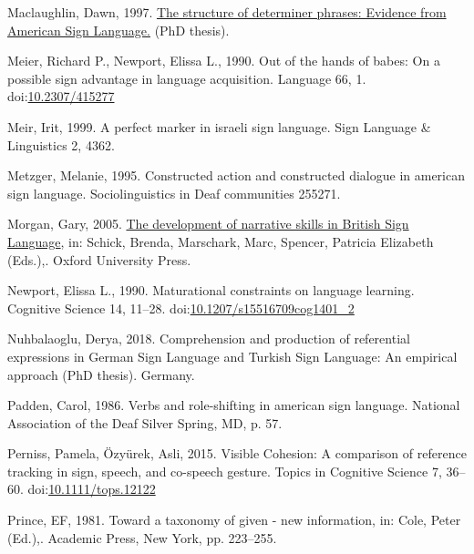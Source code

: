 \documentclass[]{elsarticle} %
\newlength{\cslhangindent}
\newenvironment{CSLReferences}[2] %
 {%
  \setlength{\parindent}{0pt}
  \ifodd #1 \everypar{\setlength{\hangindent}{\cslhangindent}}\ignorespaces\fi
  \ifnum #2 > 0
  \setlength{\parskip}{#2\baselineskip}
  \fi
 }%
 {}
\begin{document}
\begin{CSLReferences}{1}{0}
\leavevmode{}%
Maclaughlin, Dawn, 1997.
\href{http://lear.unive.it/jspui/handle/11707/7016}{The structure of
determiner phrases: Evidence from American Sign Language.} (PhD thesis).

\leavevmode{}%
Meier, Richard P., Newport, Elissa L., 1990. Out of the hands of babes:
On a possible sign advantage in language acquisition. Language 66, 1.
doi:\href{https://doi.org/10.2307/415277}{10.2307/415277}

\leavevmode{}%
Meir, Irit, 1999. A perfect marker in israeli sign language. Sign
Language \& Linguistics 2, 4362.

\leavevmode{}%
Metzger, Melanie, 1995. Constructed action and constructed dialogue in
american sign language. Sociolinguistics in Deaf communities 255271.

\leavevmode{}%
Morgan, Gary, 2005.
\href{http://www.oxfordscholarship.com/view/10.1093/acprof:oso/9780195180947.001.0001/acprof-9780195180947}{The
development of narrative skills in British Sign Language}, in: Schick,
Brenda, Marschark, Marc, Spencer, Patricia Elizabeth (Eds.),. Oxford
University Press.

\leavevmode{}%
Newport, Elissa L., 1990. Maturational constraints on language learning.
Cognitive Science 14, 11--28.
doi:\href{https://doi.org/10.1207/s15516709cog1401_2}{10.1207/s15516709cog1401\_2}

\leavevmode{}%
Nuhbalaoglu, Derya, 2018. Comprehension and production of referential
expressions in German Sign Language and Turkish Sign Language: An
empirical approach (PhD thesis). Germany.

\leavevmode{}%
Padden, Carol, 1986. Verbs and role-shifting in american sign language.
National Association of the Deaf Silver Spring, MD, p. 57.

\leavevmode{}%
Perniss, Pamela, Özyürek, Asli, 2015. Visible Cohesion: A comparison of
reference tracking in sign, speech, and co-speech gesture. Topics in
Cognitive Science 7, 36--60.
doi:\href{https://doi.org/10.1111/tops.12122}{10.1111/tops.12122}

\leavevmode{}%
Prince, EF, 1981. Toward a taxonomy of given - new information, in:
Cole, Peter (Ed.),. Academic Press, New York, pp. 223--255.


\end{CSLReferences}
\end{document}
